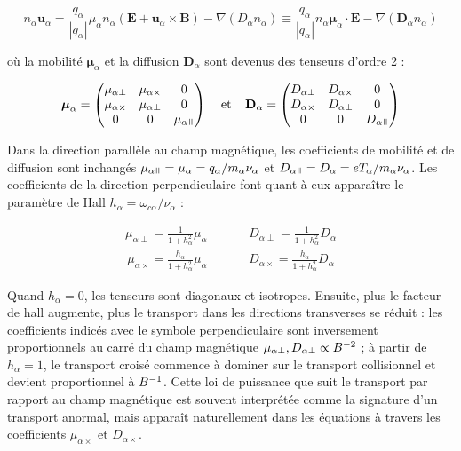 \begin{refsection}
\begin{equation}
\label{1-eqDriftDif}
n_\alpha\mathbf u_\alpha=\frac{q_\alpha}{|q_\alpha|}\mu_\alpha
n_\alpha\left(\mathbf E+\mathbf u_\alpha\times\mathbf
B\right)-\nabla\left(D_\alpha n_\alpha\right)\equiv
\frac{q_\alpha}{|q_\alpha|} n_\alpha\boldsymbol{\mu}_\alpha\cdot \mathbf
E-{\nabla\left(\mathbf{D}_\alpha n_\alpha\right)}
\end{equation}

où la mobilité $\boldsymbol{\mu}_\alpha$ et la diffusion $\mathbf{D}_\alpha$
sont devenus des tenseurs d'ordre 2 :

\begin{align}
\boldsymbol{\mu}_\alpha =
 \begin{pmatrix}
  \mu_{\alpha\perp} & \mu_{\alpha\times} & 0 \\
  \mu_{\alpha\times} & \mu_{\alpha\perp} & 0 \\
  0  & 0  & \mu_{\alpha\para} 
 \end{pmatrix}\;\;\;\;\text{et}\;\;\;\;
 \mathbf D_\alpha =
 \begin{pmatrix}
  D_{\alpha\perp} & D_{\alpha\times} & 0 \\
  D_{\alpha\times} & D_{\alpha\perp} & 0 \\
  0  & 0  & D_{\alpha\para} 
 \end{pmatrix}
\end{align}

Dans la direction parallèle au champ magnétique, les coefficients de mobilité et
de diffusion sont inchangés
$\mu_{\alpha\para}=\mu_{\alpha}=q_\alpha/m_\alpha\nu_\alpha$ et
$D_{\alpha\para}=D_\alpha=eT_\alpha/m_\alpha\nu_\alpha$. Les coefficients de la
direction perpendiculaire font quant à eux apparaître le paramètre de Hall
$h_\alpha=\omega_{c\alpha}/\nu_\alpha$ :

\begin{align}
\mu_{\alpha\perp}=\frac{1}{1+h_\alpha^2}\mu_\alpha\;\;\;\;\;\;\;\;
\;\;\;\;D_{\alpha\perp}=\frac{1}{1+h_\alpha^2}D_\alpha
\end{align}
\begin{align}
\mu_{\alpha\times}=\frac{h_\alpha}{1+h_\alpha^2}\mu_\alpha\;\;\;\;
\;\;\;\;\;\;\;\;D_{\alpha\times}=\frac{h_\alpha}{1+h_\alpha^2}D_\alpha
\end{align}

Quand $h_\alpha=0$, les tenseurs sont diagonaux et isotropes. Ensuite, plus le
facteur de hall augmente, plus le transport dans les directions transverses se
réduit :
les coefficients indicés avec le symbole perpendiculaire sont inversement
proportionnels au carré du champ magnétique $\mu_{\alpha\perp},
D_{\alpha\perp}\propto B^{{-2}}$ ; à partir de $h_\alpha=1$, le
transport croisé commence à dominer sur le transport collisionnel et devient proportionnel à
$B^{{-1}}$. Cette loi de puissance que suit le transport par rapport au
champ magnétique est souvent interprétée comme la signature d'un transport
anormal, mais apparaît naturellement dans les équations à travers les
coefficients $\mu_{\alpha\times}$ et $D_{\alpha\times}$.



%
%
\end{refsection}

